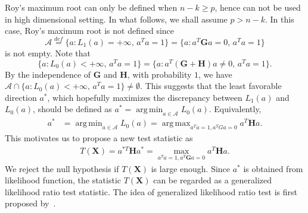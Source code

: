 \documentclass[12pt]{article} %
\DeclareMathOperator*{\argmax}{arg\,max}
\DeclareMathOperator*{\argmin}{arg\,min}
\newcommand{\bX}{\mathbf{X}}
\newcommand{\bH}{\mathbf{H}}
\newcommand{\bG}{\mathbf{G}}
\theoremstyle{definition}
\begin{document}
Roy's maximum root can only be defined when $n-k\geq p$, hence can not be used in high dimensional setting.
In what follows,  we shall assume $p>n-k$.
In this case,
Roy's maximum root is not defined since
$$\mathcal{A}\overset{def}{=}\{a:L_1(a)=+\infty, \, a^T a=1\}=\{a:a^T \bG a=0, \, a^T a=1\}$$
is not empty. 
Note that 
$$\{a:L_0(a)<+\infty, \, a^T a=1\}=\{a:a^T (\bG+\bH)a\neq 0, \, a^T a=1\}.$$
By the independence of $\bG$ and $\bH$, with probability $1$, we have $\mathcal{A}\cap \{a:L_0(a)<+\infty,\, a^T a=1\}\neq \emptyset$.
This suggests that the least favorable direction $a^*$, which hopefully maximizes the discrepancy between $L_1(a)$ and $L_0(a)$, should be defined as $a^* = \argmin_{a\in\mathcal{A}} L_0 (a)$.
Equivalently,
$$
\begin{aligned}
    a^*&=\argmin_{a\in \mathcal{A}} L_0(a) = \argmax_{a^T a=1,a^T Ga=0} {a^T \bH a}.
\end{aligned}
$$
This motivates us to propose a new test statistic as
\begin{equation*}
    \begin{aligned}
        T(\bX)=a^{*T} \bH a^*
        =
        \max_{a^T a=1, a^T \bG a=0} 
        a^T \bH a.
    \end{aligned}
\end{equation*}
We reject the null hypothesis if $T(\bX)$ is large enough.
Since $a^*$ is obtained from likelihood function, the statistic $T(\bX)$ can be regarded as a generalized likelihood ratio test statistic.
The idea of generalized likelihood ratio test is first proposed by~\citet{Zhao2016A}.
\end{document}

